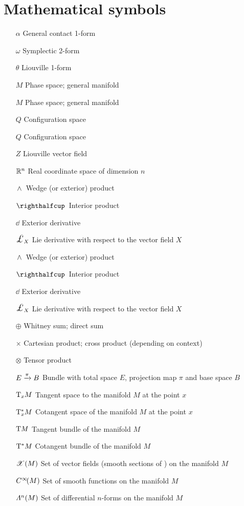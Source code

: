 \section*{Mathematical symbols}
\begin{itemize}[itemsep=0pt, leftmargin=2cm, labelsep=0cm, labelwidth=1.9cm, align=left]
    \item[$\alpha$] General contact 1-form
    \item[$\omega$] Symplectic 2-form
    \item[$\theta$] Liouville 1-form
%
    \item[$M$] Phase space; general manifold
    \item[$M$] Phase space; general manifold
    \item[$Q$] Configuration space
    \item[$Q$] Configuration space
    \item[$Z$] Liouville vector field
%
    \item[$\mathbb{R}^n$] Real coordinate space of dimension $n$
%
%
    \item[$ \,\wedge\, $]  Wedge (or exterior) product
    \item[$\intpr{}{}$]  Interior product
    \item[$\dd{}$]  Exterior derivative
    \item[$\lied{X}{}$]  Lie derivative with respect to the vector field $X$
    \item[$ \,\wedge\, $]  Wedge (or exterior) product
    \item[$\intpr{}{}$]  Interior product
    \item[$\dd{}$]  Exterior derivative
    \item[$\lied{X}{}$]  Lie derivative with respect to the vector field $X$
    \item[$\oplus$]  Whitney sum; direct sum
    \item[$\times$]  Cartesian product; cross product (depending on context)
    \item[$\otimes$]  Tensor product
    \item[$E\xrightarrow[]{\pi}B$]  Bundle with total space $E$, projection map $\pi$ and base space $B$
    \item[$\mathrm{T}_{x}M$]  Tangent space to the manifold $M$ at the point $x$
    \item[$\mathrm{T}_{x}^*M$]  Cotangent space of the manifold $M$ at the point $x$
    \item[$\mathrm{T}M$]  Tangent bundle of the manifold $M$
    \item[$\mathrm{T}^*M$]  Cotangent bundle of the manifold $M$
    \item[$\mathscr{X}\qty(M)$]  Set of vector fields (smooth sections of ) on the manifold $M$
    \item[$C^\infty\!\qty(M)$]  Set of smooth functions on the manifold $M$
    \item[$\Lambda^{n}(M)$]  Set of differential $n$-forms on the manifold $M$
\end{itemize}